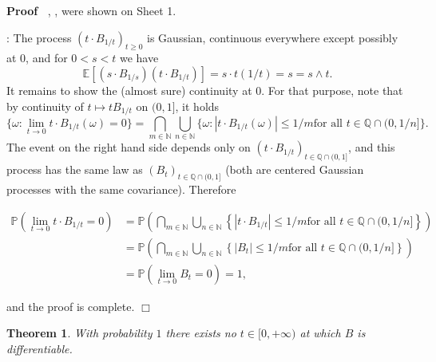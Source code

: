 \documentclass{article}
\newcommand{\tmtextit}[1]{\text{{\itshape{#1}}}}
\newenvironment{proof}{\noindent\textbf{Proof\ }}{\hspace*{\fill}$\Box$\medskip}
\newtheorem{theorem}{Theorem}
\newcommand{\1}{\mathbbm{1}}
\begin{document}
\begin{proof}
  \tmtextit{i.}, \tmtextit{ii.}, \tmtextit{iii.} were shown on Sheet 1.

  \tmtextit{iv.}: The process $(t \cdot B_{1 / t})_{t \geqslant 0}$ is
  Gaussian, continuous everywhere except possibly at 0, and for $0 < s < t$ we
  have
  \[ \mathbb{E} [(s \cdot B_{1 / s}) (t \cdot B_{1 / t})] = s \cdot t (1 / t)
     = s = s \wedge t. \]
  It remains to show the (almost sure) continuity at 0. For that purpose, note
  that by continuity of $t \mapsto t B_{1 / t}$ on $(0, 1]$, it holds
  \[ \{ \omega : \lim_{t \rightarrow 0} t \cdot B_{1 / t} (\omega) = 0 \} =
     \bigcap_{m \in \mathbb{N}} \bigcup_{n \in \mathbb{N}} \{\omega : |t \cdot
     B_{1 / t} (\omega) | \leqslant 1 / m \text{for all } t \in \mathbb{Q}
     \cap (0, 1 / n]\} . \]
  The event on the right hand side depends only on $(t \cdot B_{1 / t})_{t \in
  \mathbb{Q} \cap (0, 1]}$, and this process has the same law as $(B_t)_{t \in
  \mathbb{Q} \cap (0, 1]}$ (both are centered Gaussian processes with the same
  covariance). Therefore

  \begin{align*}
    \mathbb{P} (\lim_{t \rightarrow 0} t \cdot B_{1 / t} = 0) & =\mathbb{P}
    \left( \bigcap_{m \in \mathbb{N}} \bigcup_{n \in \mathbb{N}} \left\{ |t
    \cdot B_{1 / t} | \leqslant 1 / m \text{for all } t \in \mathbb{Q} \cap
    (0, 1 / n] \right\} \right)\\
    & =\mathbb{P} \left( \bigcap_{m \in \mathbb{N}} \bigcup_{n \in
    \mathbb{N}} \left\{ |B_t | \leqslant 1 / m \text{for all } t \in
    \mathbb{Q} \cap (0, 1 / n] \right\} \right)\\
    & =\mathbb{P} (\lim_{t \rightarrow 0} B_t = 0) = 1,
  \end{align*}

  and the proof is complete.
\end{proof}

\begin{theorem}
  \label{thm:Bm nowhere differentiable}With probability $1$ there exists no $t
  \in [0, + \infty)$ at which $B$ is differentiable.
\end{theorem}
\end{document}
